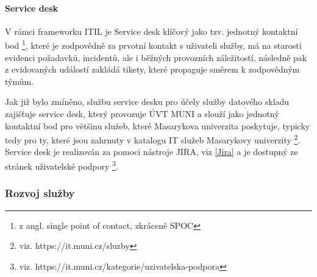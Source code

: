 \documentclass[
  digital,     %
  twoside,     %
  lof,         %
  lot,         %
]{fithesis4}
\begin{document}
\paragraph{Service desk}
V rámci frameworku ITIL je Service desk klíčový jako tzv. jednotný kontaktní bod \footnote{z angl. single point of contact, zkráceně SPOC}, které je zodpovědně za prvotní kontakt s uživateli služby, má na starosti evidenci požadavků, incidentů, ale i běžných provozních záležitostí, následně pak z evidovaných událostí zakládá tikety, které propaguje směrem k zodpovědným týmům. 

Jak již bylo zmíněno, službu service desku pro účely služby datového skladu zajišťuje service desk, který provozuje ÚVT MUNI a slouží jako jednotný kontaktní bod pro většinu služeb, které Masarykova univerzita poskytuje, typicky tedy pro ty, které jsou zahrnuty v katalogu IT služeb Masarykovy univerzity \footnote{viz. https://it.muni.cz/sluzby}. Service desk je realizován za pomoci nástroje JIRA, viz \ref{Jira} a je dostupný ze stránek uživatelské podpory \footnote{viz. https://it.muni.cz/kategorie/uzivatelska-podpora}.

\subsubsection{Rozvoj služby}
\end{document}
